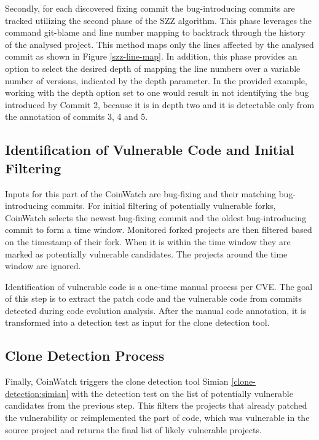     Secondly, for each discovered fixing commit the bug-introducing commits are tracked utilizing the second
    phase of the SZZ algorithm. This phase leverages the command git-blame and line number mapping to backtrack
    through the history of the analysed project. This method maps only the lines affected by the
    analysed commit as shown in Figure \ref{szz-line-map}. In addition, this phase provides an option to
    select the desired depth of mapping the line numbers over a variable number of versions, indicated by
    the depth parameter. In the provided example, working with the depth option set to one would result in
    not identifying the bug introduced by Commit 2, because it is in depth two and it is detectable only from
    the annotation of commits 3, 4 and 5.

  \subsection*{Identification of Vulnerable Code and Initial Filtering}
    Inputs for this part of the CoinWatch are bug-fixing and their matching bug-introducing commits.
    For initial filtering of potentially vulnerable forks, CoinWatch selects the newest bug-fixing commit
    and the oldest bug-introducing commit to form a time window. Monitored forked projects are then filtered
    based on the timestamp of their fork. When it is within the time window they are marked as potentially
    vulnerable candidates. The projects around the time window are ignored.

    Identification of vulnerable code is a one-time manual process per CVE. The goal of this step is to
    extract the patch code and the vulnerable code from commits detected during code evolution analysis.
    After the manual code annotation, it is transformed into a detection test as input for the clone detection
    tool.

  \subsection*{Clone Detection Process}
    Finally, CoinWatch triggers the clone detection tool Simian \ref{clone-detection:simian} with the detection
    test on the list of potentially vulnerable candidates from the previous step. This filters the projects
    that already patched the vulnerability or reimplemented the part of code, which was vulnerable in the
    source project and returns the final list of likely vulnerable projects.


